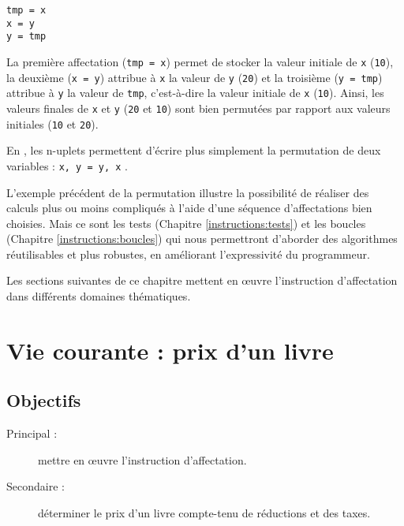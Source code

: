 \noindent\begin{minipage}{2cm}
\begin{Verbatim}
tmp = x
x = y
y = tmp
\end{Verbatim}
\end{minipage}
\hfill
\begin{minipage}{13cm}
La première affectation ({\tt tmp = x}) permet de stocker la valeur initiale de {\tt x} ({\tt 10}),
la deuxième ({\tt x = y}) attribue à {\tt x} la valeur de {\tt y} ({\tt 20}) et la troisième ({\tt y = tmp})
attribue à {\tt y} la valeur de {\tt tmp}, c'est-à-dire la valeur initiale de {\tt x} ({\tt 10}).
Ainsi, les valeurs finales de {\tt x} et {\tt y} ({\tt 20} et {\tt 10}) sont bien permutées 
par rapport aux valeurs initiales ({\tt 10} et {\tt 20}).
\end{minipage}
\vspace*{2mm}

\noindent En \python, les n-uplets permettent d'écrire plus simplement la permutation
de deux variables : \texttt{x, y = y, x} .

L'exemple précédent de la permutation illustre la possibilité
de réaliser des calculs plus ou moins compliqués à l'aide d'une séquence 
d'affectations bien choisies. 
Mais ce sont les tests (Chapitre \ref{instructions:tests}) 
et les boucles  (Chapitre \ref{instructions:boucles}) 
qui nous permettront d'aborder des algorithmes réutilisables et plus robustes, 
en améliorant l'expressivité du programmeur.

Les sections suivantes de ce chapitre mettent en \oe uvre l'instruction d'affectation
dans différents domaines thématiques.

\section{Vie courante : prix d'un livre}\label{affectation:vie-courante}

\subsection{Objectifs}\label{affectation:vie-courante:objectif}
\begin{description}
\item[Principal : ] mettre en \oe uvre l'instruction d'affectation.
\item[Secondaire :] déterminer le prix d'un livre compte-tenu de réductions et des taxes.
\end{description}


